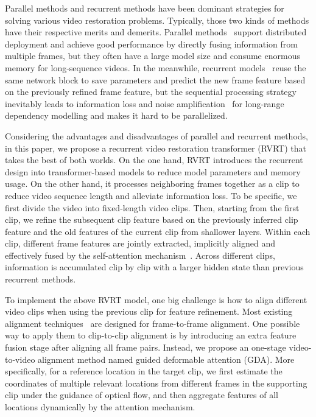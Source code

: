 \documentclass{article}
\newlength \g
\begin{document}
Parallel methods and recurrent methods have been dominant strategies for solving various video restoration problems. Typically, those two kinds of methods have their respective merits and demerits. Parallel methods~\cite{caballero2017VESPCN,huang2017video,wang2019edvr,tian2020tdan,li2020mucan,su2017dvddeblur,zhou2019spatio,isobe2020tga,li2021arvo,cao2021videosr, liang2022vrt} support distributed deployment and achieve good performance by directly fusing information from multiple frames, but they often have a large model size and consume enormous memory for long-sequence videos. In the meanwhile, recurrent models~\cite{huang2015bidirectional,sajjadi2018FRVSR,fuoli2019rlsp,haris2019RBPN,isobe2020rsdn,isobe2020rrn,chan2021basicvsr,chan2021basicvsr++,lin2021fdan,nah2019recurrent,zhong2020efficient,son2021recurrent} reuse the same network block to save parameters and predict the new frame feature based on the previously refined frame feature, but the sequential processing strategy inevitably leads to information loss and noise amplification~\cite{chu2020learning} for long-range dependency modelling and makes it hard to be parallelized.

Considering the advantages and disadvantages of parallel and recurrent methods, in this paper, we propose a recurrent video restoration transformer (RVRT) that takes {the best of both worlds}. On the one hand, RVRT introduces the recurrent design into transformer-based models to reduce model parameters and memory usage. On the other hand, it processes neighboring frames together as a clip to reduce video sequence length and alleviate information loss. To be specific, we first divide the video into fixed-length video clips. Then, starting from the first clip, we refine the subsequent clip feature based on the previously inferred clip feature and the old features of the current clip from shallower layers. Within each clip, different frame features are jointly extracted, implicitly aligned and effectively fused by the self-attention mechanism~\cite{vaswani2017transformer, liu2021swin, liang21swinir}. Across different clips, information is accumulated clip by clip with a larger hidden state than previous recurrent methods.

To implement the above RVRT model, one big challenge is how to align different video clips when using the previous clip for feature refinement. Most existing alignment techniques~\cite{ranjan2017spynet, sun2018pwc, sajjadi2018FRVSR, xue2019TOFlow-Vimeo-90K, chan2021basicvsr, dai2017deformable, tian2020tdan, wang2019edvr, chan2021basicvsr++, liang2022vrt} are designed for frame-to-frame alignment. One possible way to apply them to clip-to-clip alignment is by introducing an extra feature fusion stage after aligning all frame pairs. Instead, we propose an one-stage {video-to-video alignment} method named guided deformable attention (GDA). More specifically, for a reference location in the target clip, we first estimate the coordinates of multiple relevant locations from different frames in the supporting clip under the guidance of optical flow, and then aggregate features of all locations dynamically by the attention mechanism.
\end{document}
